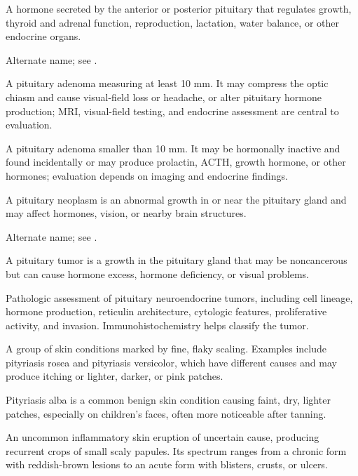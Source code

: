 A hormone secreted by the anterior or posterior pituitary that regulates growth, thyroid and adrenal function, reproduction, lactation, water balance, or other endocrine organs.

 Alternate name; see .

 A pituitary adenoma measuring at least 10 mm. It may compress the optic chiasm and cause visual-field loss or headache, or alter pituitary hormone production; MRI, visual-field testing, and endocrine assessment are central to evaluation.

 A pituitary adenoma smaller than 10 mm. It may be hormonally inactive and found incidentally or may produce prolactin, ACTH, growth hormone, or other hormones; evaluation depends on imaging and endocrine findings.

 A pituitary neoplasm is an abnormal growth in or near the pituitary gland and may affect hormones, vision, or nearby brain structures.

 Alternate name; see .

 A pituitary tumor is a growth in the pituitary gland that may be noncancerous but can cause hormone excess, hormone deficiency, or visual problems.

 Pathologic assessment of pituitary neuroendocrine tumors, including cell lineage, hormone production, reticulin architecture, cytologic features, proliferative activity, and invasion. Immunohistochemistry helps classify the tumor.

 A group of skin conditions marked by fine, flaky scaling. Examples include pityriasis rosea and pityriasis versicolor, which have different causes and may produce itching or lighter, darker, or pink patches.

 Pityriasis alba is a common benign skin condition causing faint, dry, lighter patches, especially on children’s faces, often more noticeable after tanning.

 An uncommon inflammatory skin eruption of uncertain cause, producing recurrent crops of small scaly papules. Its spectrum ranges from a chronic form with reddish-brown lesions to an acute form with blisters, crusts, or ulcers.

